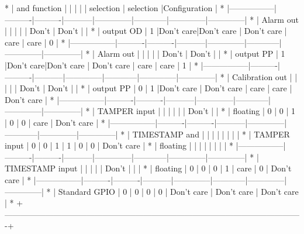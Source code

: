\begin{DoxyVerb}
* |  and function   |          |          |           |              | selection  |  selection   |Configuration |
* |-----------------|----------|----------|-----------|--------------|------------|--------------|--------------|
* |   Alarm out     |          |          |           |              |    Don't   |     Don't    |              |
* |   output OD     |     1    |Don't care|Don't care | Don't care   |    care    |     care     |      0       |
* |-----------------|----------|----------|-----------|--------------|------------|--------------|--------------|
* |   Alarm out     |          |          |           |              |    Don't   |     Don't    |              |
* |   output PP     |     1    |Don't care|Don't care | Don't care   |    care    |     care     |      1       |
* |-----------------|----------|----------|-----------|--------------|------------|--------------|--------------|
* | Calibration out |          |          |           |              |    Don't   |     Don't    |              |
* |   output PP     |     0    |    1     |Don't care | Don't care   |    care    |     care     |  Don't care  |
* |-----------------|----------|----------|-----------|--------------|------------|--------------|--------------|
* |  TAMPER input   |          |          |           |              |            |     Don't    |              |
* |   floating      |     0    |    0     |     1     |      0       |      0     |     care     |  Don't care  |
* |-----------------|----------|----------|-----------|--------------|------------|--------------|--------------|
* |  TIMESTAMP and  |          |          |           |              |            |              |              |
* |  TAMPER input   |     0    |    0     |     1     |      1       |      0     |      0       |  Don't care  |
* |   floating      |          |          |           |              |            |              |              |
* |-----------------|----------|----------|-----------|--------------|------------|--------------|--------------|
* | TIMESTAMP input |          |          |           |              |    Don't   |              |              |
* |    floating     |     0    |    0     |     0     |      1       |    care    |      0       |  Don't care  |
* |-----------------|----------|----------|-----------|--------------|------------|--------------|--------------|
* |  Standard GPIO  |     0    |    0     |     0     |      0       | Don't care |  Don't care  |  Don't care  |
* +-------------------------------------------------------------------------------------------------------------+

\end{DoxyVerb}
